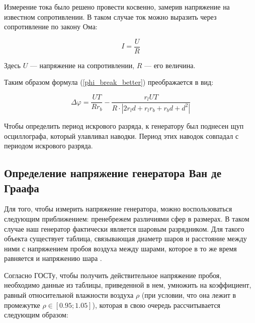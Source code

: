 \documentclass[a4paper, 12pt]{article}
\renewcommand{\phi}{\varphi} %
\begin{document}
Измерение тока было решено провести косвенно, замерив напряжение на известном сопротивлении. В таком случае ток можно выразить через сопротивление по закону Ома:

\begin{equation}
	I = \frac{U}{R}
	\label{Om}
\end{equation}

Здесь $U$ --- напряжение на сопротивлении, $R$ --- его величина.

\medspace

Таким образом формула (\ref{phi_break_better}) преображается в вид:

\begin{equation}
	\Delta \phi = \frac{UT}{Rr_b} - \frac{r_l UT}{R \cdot \left|2 r_l d + r_l r_b + r_b d + d^2\right|}
	\label{phi_break_best}
\end{equation}

\medspace

Чтобы определить период искрового разряда, к генератору был поднесен щуп осциллографа, который улавливал наводки. Период этих наводок совпадал с периодом искрового разряда.

\subsection{Определение напряжение генератора Ван де Граафа}

Для того, чтобы измерить напряжение генератора, можно воспользоваться следующим приближением: пренебрежем различиями сфер в размерах. В таком случае наш генератор фактически является шаровым разрядником. Для такого объекта существует таблица, связывающая диаметр шаров и расстояние между ними с напряжением пробоя воздуха между шарами, которое в то же время равняется и напряжению шара \cite{GOST}.


Согласно ГОСТу, чтобы получить действительное напряжение пробоя, необходимо данные из таблицы, приведенной в нем, умножить на коэффициент, равный относительной влажности воздуха $\rho$ (при условии, что она лежит в промежутке $\rho\in [0.95; 1.05]$), которая в свою очередь рассчитывается следующим образом:
\end{document}
